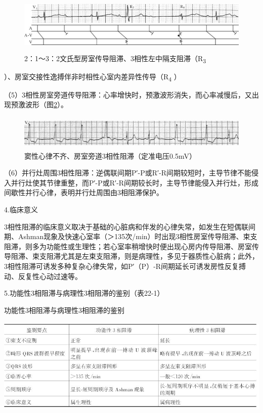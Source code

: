 \begin{figure}[!htbp]
 \centering
 \includegraphics[width=5.79167in,height=1.09375in]{./images/Image00371.jpg}
 \captionsetup{justification=centering}
 \caption{2：1～3：2文氏型房室传导阻滞、3相性左中隔支阻滞（R\textsubscript{3}}
 \label{fig22-6}
  \end{figure} 
）、房室交接性逸搏伴非时相性心室内差异性传导（R\textsubscript{4} ）

（5）3相性房室旁道传导阻滞：心率增快时，预激波形消失，而心率减慢后，又出现预激波形（图\ref{fig22-7}）。

\begin{figure}[!htbp]
 \centering
 \includegraphics[width=5.78125in,height=0.65625in]{./images/Image00372.jpg}
 \captionsetup{justification=centering}
 \caption{窦性心律不齐、房室旁道3相性阻滞（定准电压0.5mV）}
 \label{fig22-7}
  \end{figure} 

（6）并行灶周围3相性阻滞：逆偶联间期P′-P或R′-R间期较短时，主导节律不能侵入并行灶使其节律重整，而P′-P或R′-R间期较长时，主导节律能侵入并行灶，形成间歇性并行心律，表明并行灶周围由3相阻滞保护。

4.临床意义

3相性阻滞的临床意义取决于基础的心脏病和伴发的心律失常，如发生在短偶联间期、Ashman现象及快速心室率（＞135次/min）时出现3相性房室传导阻滞、束支阻滞，则多为功能性或生理性；若心室率稍增快时便出现心房内传导阻滞、房室传导阻滞、束支阻滞尤其是左束支阻滞，则是病理性，多见于器质性心脏病；此外，3相性阻滞可诱发多种复杂心律失常，如P′（P）-R间期延长可诱发房性反复搏动、反复性心动过速等。

5.功能性3相阻滞与病理性3相阻滞的鉴别（表22-1）

\begin{table}[htbp]
\centering
\caption{功能性3相阻滞与病理性3相阻滞的鉴别}
\label{tab22-1}
\includegraphics[width=5.44792in,height=1.82292in]{./images/Image00373.jpg}
\end{table}

